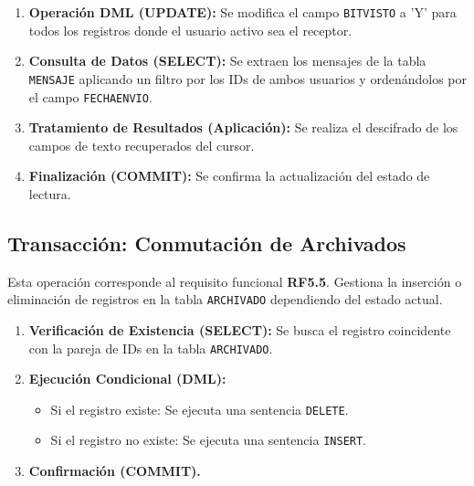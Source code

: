 \begin{enumerate}
    \item \textbf{Operación DML (UPDATE):} Se modifica el campo \texttt{BITVISTO} a 'Y' para todos los registros donde el usuario activo sea el receptor.
    \item \textbf{Consulta de Datos (SELECT):} Se extraen los mensajes de la tabla \texttt{MENSAJE} aplicando un filtro por los IDs de ambos usuarios y ordenándolos por el campo \texttt{FECHAENVIO}.
    \item \textbf{Tratamiento de Resultados (Aplicación):} Se realiza el descifrado de los campos de texto recuperados del cursor.
    \item \textbf{Finalización (COMMIT):} Se confirma la actualización del estado de lectura.
\end{enumerate}

\subsection{Transacción: Conmutación de Archivados}
Esta operación corresponde al requisito funcional \textbf{RF5.5}. Gestiona la inserción o eliminación de registros en la tabla \texttt{ARCHIVADO} dependiendo del estado actual.

\begin{enumerate}
    \item \textbf{Verificación de Existencia (SELECT):} Se busca el registro coincidente con la pareja de IDs en la tabla \texttt{ARCHIVADO}.
    \item \textbf{Ejecución Condicional (DML):}
    \begin{itemize}
        \item Si el registro existe: Se ejecuta una sentencia \texttt{DELETE}.
        \item Si el registro no existe: Se ejecuta una sentencia \texttt{INSERT}.
    \end{itemize}
    \item \textbf{Confirmación (COMMIT).}
\end{enumerate}
